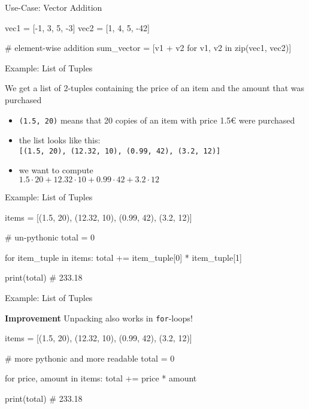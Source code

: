\begin{frame}[fragile]{Use-Case: Vector Addition}

    \begin{pythoncode}
vec1 = [-1, 3, 5, -3]
vec2 = [1, 4, 5, -42]

# element-wise addition
sum_vector = [v1 + v2 for v1, v2 in zip(vec1, vec2)]
    \end{pythoncode}

\end{frame}


\begin{frame}{Example: List of Tuples}

    We get a list of 2-tuples containing the price of an item and the amount that was purchased

    \vspace{1em}

    \begin{itemize}
        \item {\tt (1.5, 20)} means that 20 copies of an item with price 1.5€ were purchased
        \item the list looks like this: \\
            {\tt [(1.5, 20), (12.32, 10), (0.99, 42), (3.2, 12)]}
        \item we want to compute \\
            $1.5 \cdot 20 + 12.32 \cdot 10 + 0.99 \cdot 42 + 3.2 \cdot 12$
    \end{itemize}

\end{frame}

\begin{frame}[fragile]{Example: List of Tuples}

    \begin{pythoncode}
items = [(1.5, 20), (12.32, 10), (0.99, 42), (3.2, 12)]

# un-pythonic
total = 0

for item_tuple in items:
    total += item_tuple[0] * item_tuple[1]

print(total)    # 233.18
    \end{pythoncode}

\end{frame}

\begin{frame}[fragile]{Example: List of Tuples}

    \begin{alertblock}{{\bf Improvement}}
        Unpacking also works in {\tt for}-loops!
    \end{alertblock}

    \begin{pythoncode}
items = [(1.5, 20), (12.32, 10), (0.99, 42), (3.2, 12)]

# more pythonic and more readable
total = 0

for price, amount in items:
    total += price * amount

print(total)    # 233.18
    \end{pythoncode}

\end{frame}

